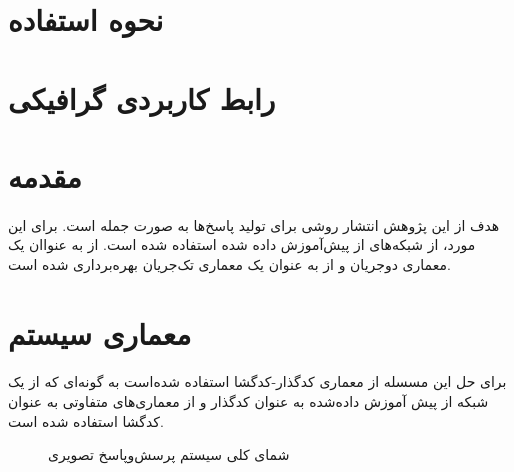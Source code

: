 \section{نحوه استفاده}
\paragraph{}{

}

\section{رابط کاربردی گرافیکی}
\paragraph{}{

}

\section{مقدمه}
\paragraph{}{
    هدف از این پژوهش انتشار روشی برای تولید پاسخ‌ها به صورت جمله است. برای این 
    مورد، از شبکه‌های از پیش‌آموزش داده شده استفاده شده است. از 
     \cite{tan-bansal-2019-lxmert}
    به عنواان یک معماری دو‌جریان و از 
     \cite{li-etal-2020-bert-vision}
    به عنوان یک معماری تک‌جریان بهره‌برداری شده است. 
}



\section{
  معماری سیستم
 }

\paragraph{}{
    برای حل این مسسله از معماری کدگذار-کدگشا استفاده شده‌است به گونه‌ای 
    که از یک شبکه از پیش آموزش داده‌شده به عنوان کدگذار و از معماری‌های متفاوتی 
    به عنوان کدگشا استفاده شده است. 
    
}




\begin{figure}[H]
    \caption{شمای کلی سیستم پرسش‌و‌پاسخ تصویری}
    \label{fig:overview}
\end{figure}

